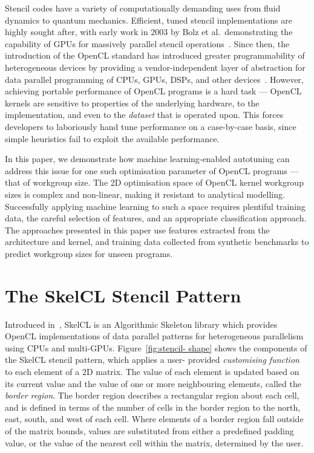 \documentclass[preprint,nonatbib,10pt,nocopyrightspace]{sigplanconf}
\begin{document}
Stencil codes have a variety of computationally demanding uses from fluid
dynamics to quantum mechanics. Efficient, tuned stencil implementations are
highly sought after, with early work in 2003 by Bolz et al.\ demonstrating the
capability of GPUs for massively parallel stencil operations~\cite{Bolz2003}.
Since then, the introduction of the OpenCL standard has introduced greater
programmability of heterogeneous devices by providing a vendor-independent layer
of abstraction for data parallel programming of CPUs, GPUs, DSPs, and other
devices~\cite{Stone2010}. However, achieving portable performance of OpenCL
programs is a hard task --- OpenCL kernels are sensitive to properties of the
underlying hardware, to the implementation, and even to the \emph{dataset} that
is operated upon. This forces developers to laboriously hand tune performance on
a case-by-case basis, since simple heuristics fail to exploit the available
performance.

In this paper, we demonstrate how machine learning-enabled autotuning can
address this issue for one such optimisation parameter of OpenCL programs ---
that of workgroup size. The 2D optimisation space of OpenCL kernel workgroup
sizes is complex and non-linear, making it resistant to analytical modelling.
Successfully applying machine learning to such a space requires plentiful
training data, the careful selection of features, and an appropriate
classification approach. The approaches presented in this paper use features
extracted from the architecture and kernel, and training data collected from
synthetic benchmarks to predict workgroup sizes for unseen programs.


\section{The SkelCL Stencil Pattern}

Introduced in~\cite{Steuwer2011}, SkelCL is an Algorithmic Skeleton library
which provides OpenCL implementations of data parallel patterns for
heterogeneous parallelism using CPUs and multi-GPUs. Figure~\ref{fig:stencil-
shape} shows the components of the SkelCL stencil pattern, which applies a user-
provided \emph{customising function} to each element of a 2D matrix. The value
of each element is updated based on its current value and the value of one or
more neighbouring elements, called the \emph{border region}. The border region
describes a rectangular region about each cell, and is defined in terms of the
number of cells in the border region to the north, east, south, and west of each
cell. Where elements of a border region fall outside of the matrix bounds,
values are substituted from either a predefined padding value, or the value of
the nearest cell within the matrix, determined by the user.
\end{document}
